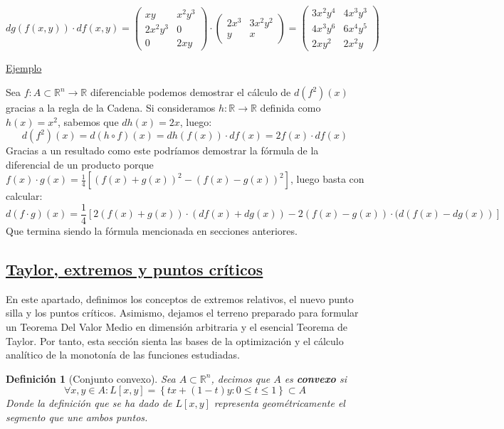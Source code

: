 \documentclass[10pt,a4paper,openright]{book}
\theoremstyle{break}
\newtheorem*{defi}{Definición}
\begin{document}
$$d g (f(x,y)) \cdot df(x,y) = \begin{pmatrix}
xy & x^2 y^3 \\ 2x^2y^3 & 0 \\ 0 & 2xy
\end{pmatrix} \cdot  \begin{pmatrix}
2x^3 & 3x^2y^2 \\ y & x
\end{pmatrix} = \begin{pmatrix}
3x^2y^4 & 4x^3y^3 \\ 4x^3y^6 & 6x^4y^5 \\ 2xy^2 & 2x^2y
\end{pmatrix}$$

\underline{Ejemplo}

Sea $f: A \subset \mathbb{R}^n \to \mathbb{R}$ diferenciable podemos demostrar el cálculo de $d(f^2)(x)$ gracias a la regla de la Cadena.
Si consideramos $h: \mathbb{R} \to \mathbb{R}$ definida como $h(x)=x^2$, sabemos que $dh(x) = 2x$, luego:
$$d(f^2)(x) = d(h \circ f)(x) = d h(f(x)) \cdot df(x) = 2 f(x) \cdot df(x)$$
Gracias a un resultado como este podríamos demostrar la fórmula de la diferencial de un producto porque $f(x)\cdot g(x) = \frac{1}{4} [(f(x) + g(x))^2 - (f(x) - g(x))^2]$, luego basta con calcular:
$$d(f \cdot g) (x) = \frac{1}{4}\left[ 2 (f(x) + g(x)) \cdot (df(x) + dg(x)) - 2 (f(x) - g(x)) \cdot (d(f(x) - dg(x)) \right]$$
Que termina siendo la fórmula mencionada en secciones anteriores.

\subsection*{\underline{Taylor, extremos y puntos críticos}}
En este apartado, definimos los conceptos de extremos relativos, el nuevo punto silla y los puntos críticos. Asimismo, dejamos el terreno preparado para formular un Teorema Del Valor Medio en dimensión arbitraria y el esencial Teorema de Taylor. Por tanto, esta sección sienta las bases de la optimización y el cálculo analítico de la monotonía de las funciones estudiadas.

\begin{defi}[Conjunto convexo]
Sea $A \subset \mathbb{R}^n$, decimos que $A$ es \textbf{convexo} si 
$$\forall x,y \in A : L[x,y] = \left\lbrace tx + (1-t) y : 0 \leq t \leq 1 \right\rbrace \subset A$$
Donde la definición que se ha dado de $L[x,y]$ representa geométricamente el segmento que une ambos puntos.
\end{defi}
	    
\end{document}
